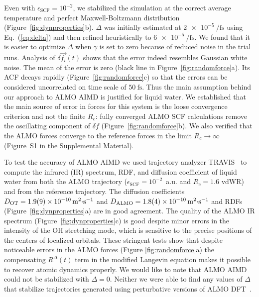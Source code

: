 \documentclass[aps,prl,reprint,amsmath,amssymb]{revtex4-1}
\begin{document}
Even with $\epsilon_{\text{SCF}} = 10^{-2}$, we stabilized the simulation at the correct average temperature and perfect Maxwell-Boltzmann distribution (Figure~\ref{fig:dynproperties}b). $\Delta$ was initially estimated at $\SI{2e-5}{\per\fs}$ using Eq.~(\ref{eq:delta}) and then refined heuristically to $\SI{6e-5}{\per\fs}$. 
We found that it is easier to optimize $\Delta$ when $\gamma$ is set to zero because of reduced noise in the trial runs. 
%
Analysis of $\delta \vec{f_{i}}(t)$ shows that the error indeed resembles Gaussian white noise. The mean of the error is zero (black line in Figure~\ref{fig:randomforce}a). Its ACF decays rapidly (Figure~\ref{fig:randomforce}c) so that the errors can be considered uncorrelated on time scale of $\SI{50}{\fs}$. Thus the main assumption behind our approach to ALMO AIMD is justified for liquid water. We established that the main source of error in forces for this system is the loose convergence criterion and not the finite $R_c$: fully converged ALMO SCF calculations remove the oscillating component of $\delta f$ (Figure~\ref{fig:randomforce}b). We also verified that the ALMO forces converge to the reference forces in the limit $R_{c} \rightarrow \infty$ 
(Figure~S1 in the Supplemental Material).



To test the accuracy of ALMO AIMD we used trajectory analyzer TRAVIS~\cite{a:travis-main} to compute the infrared (IR) spectrum, RDF, and diffusion coefficient of liquid water from both the ALMO trajectory ($\epsilon_{\text{SCF}} = 10^{-2}$~a.u. and $R_{c} = 1.6$ vdWR) and from the reference trajectory. 
The diffusion coefficients $D_{\text{OT}}=\SI{1.9\pm0.9E-10}{\m^{2}\cdot\s^{-1}}$ and $D_{\text{ALMO}}=\SI{1.8\pm0.4E-10}{\m^{2}\cdot\s^{-1}}$ and RDFs (Figure~\ref{fig:dynproperties}a) are in good agreement. The quality of the ALMO IR spectrum (Figure~\ref{fig:dynproperties}c) is good despite minor errors in the intensity of the OH stretching mode, which is sensitive to the precise positions of the centers of localized orbitals. These stringent tests show that despite noticeable errors in the ALMO forces (Figure \ref{fig:randomforce}a) the compensating $R^{\Delta}(t)$ term in the modified Langevin equation makes it possible to recover atomic dynamics properly. We would like to note that ALMO AIMD could not be stabilized with $\Delta=0$. Neither we were able to find any values of $\Delta$ that stabilize trajectories generated using perturbative versions of ALMO DFT~\cite{a:almo-ls}.
\end{document}
